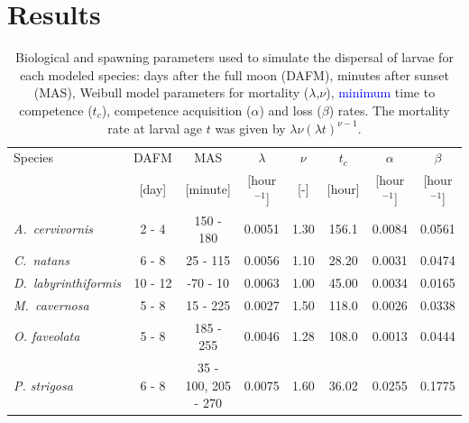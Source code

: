 \documentclass[preprint,12pt,authoryear]{elsarticle}
\newcommand{\modif}[1]{\textcolor{blue}{#1}}
\begin{document}
	\section*{Results}
	
	\begin{table}
		\begin{adjustwidth}{-1in}{-1in}
			\centering
			\footnotesize
			\begin{tabular}{lccccccc}
				\hline
				Species & DAFM  & MAS      &  $\lambda$     & $\nu$ & $t_c$  & $\alpha$      & $\beta$ \\
				& [day] & [minute] &  [hour$^{-1}$] & [-]   & [hour] & [hour$^{-1}$] & [hour$^{-1}$] \\
				\hline
				\textit{A.~cervivornis} & 2 - 4 & 150 - 180 & 0.0051 & 1.30 & 156.1 & 0.0084 & 0.0561 \\
				\textit{C.~natans}      & 6 - 8 & 25 - 115  &  0.0056 & 1.10 & 28.20 & 0.0031 & 0.0474 \\
				\textit{D.~labyrinthiformis} & 10 - 12 & -70 - 10 & 0.0063 & 1.00 &  45.00 & 0.0034 & 0.0165 \\
				\textit{M.~cavernosa}   & 5 - 8 & 15 - 225 & 0.0027 & 1.50 & 118.0 & 0.0026 & 0.0338 \\
				\textit{O. faveolata}   & 5 - 8 & 185 - 255 &  0.0046 & 1.28 & 108.0 & 0.0013 & 0.0444 \\
				\textit{P. strigosa}    & 6 - 8 &  35 - 100, 205 - 270 & 0.0075 & 1.60 & 36.02 & 0.0255 & 0.1775 \\
				\hline
			\end{tabular}
		\end{adjustwidth}
		\caption{Biological and spawning parameters used to simulate the dispersal of larvae for each modeled species: days after the full moon (DAFM), minutes after sunset (MAS), Weibull model parameters for mortality ($\lambda$,$\nu$), \modif{minimum} time to competence ($t_c$), competence acquisition ($\alpha$) and loss ($\beta$) rates. The mortality rate at larval age $t$ was given by $\lambda\nu(\lambda t)^{\nu-1}$.}\label{tab:species}
	\end{table}
	
\end{document}
